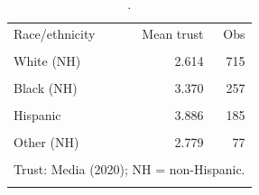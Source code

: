\begin{table}[htbp]\centering
\caption{.}
\label{tab:trust_mean_by_race_eth_media_2020}
\begin{tabular}{lrr}\toprule
Race/ethnicity & Mean trust & Obs \\\\ \midrule
White (NH) & 2.614 & 715 \\\\
Black (NH) & 3.370 & 257 \\\\
Hispanic & 3.886 & 185 \\\\
Other (NH) & 2.779 & 77 \\\\
\bottomrule
\multicolumn{3}{l}{\footnotesize Trust: Media (2020); NH = non-Hispanic.} \\\\
\end{tabular}
\end{table}

